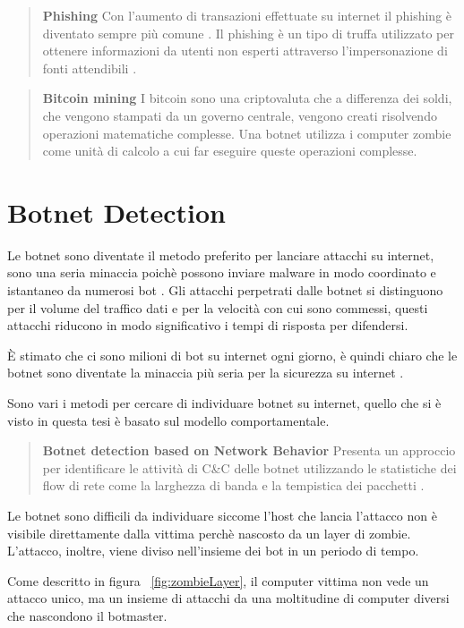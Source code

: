 \documentclass[../main.tex]{subfiles}
\begin{document}
\begin{verse}
				\textbf{Phishing} Con l'aumento di transazioni effettuate su internet il phishing è diventato sempre più comune \cite{phishing}. Il phishing è un tipo di truffa utilizzato per ottenere informazioni da utenti non esperti attraverso l'impersonazione di fonti attendibili \cite{phishingdef}.
\end{verse}

\begin{verse}
				\textbf{Bitcoin mining} I bitcoin sono una criptovaluta che a differenza dei soldi, che vengono stampati da un governo centrale, vengono creati risolvendo operazioni matematiche complesse. Una botnet utilizza i computer zombie come unità di calcolo a cui far eseguire queste operazioni complesse.
\end{verse}

\section{Botnet Detection}
Le botnet sono diventate il metodo preferito per lanciare attacchi su internet, sono una seria minaccia poichè possono inviare malware in modo coordinato e istantaneo da numerosi bot \cite{botnetdetection}.
Gli attacchi perpetrati dalle botnet si distinguono per il volume del traffico dati e per la velocità con cui sono commessi, questi attacchi riducono in modo significativo i tempi di risposta per difendersi.

È stimato che ci sono milioni di bot su internet ogni giorno, è quindi chiaro che le botnet sono diventate la minaccia più seria per la sicurezza su internet \cite{botnetdetection}.

Sono vari i metodi per cercare di individuare botnet su internet, quello che si è visto in questa tesi è basato sul modello comportamentale.
\begin{verse}
				\textbf{Botnet detection based on Network Behavior} Presenta un approccio per identificare le attività di C\&C delle botnet utilizzando le statistiche dei flow di rete come la larghezza di banda e la tempistica dei pacchetti \cite{botnetdetection}.
\end{verse}

Le botnet sono difficili da individuare siccome l'host che lancia l'attacco non è visibile direttamente dalla vittima perchè nascosto da un layer di zombie. L'attacco, inoltre, viene diviso nell'insieme dei bot in un periodo di tempo. 

Come descritto in figura ~\ref{fig:zombieLayer}, il computer vittima non vede un attacco unico, ma un insieme di attacchi da una moltitudine di computer diversi che nascondono il botmaster.
\end{document}
